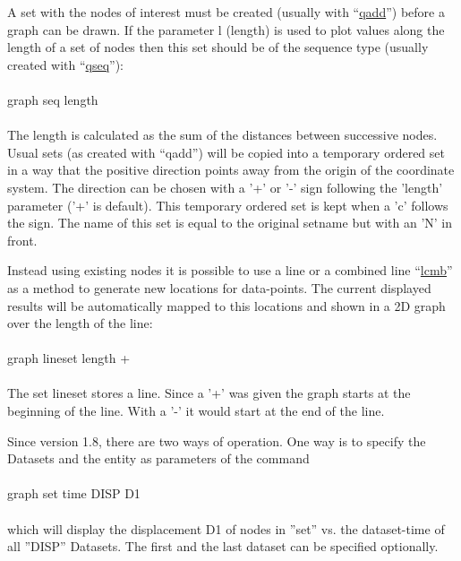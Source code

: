 \documentclass{article}
\providecommand{\htmlref}[2]{\hyperref[#2]{#1}}
\begin{document}
A set with the nodes of interest must be created (usually with ``\htmlref{qadd}{qadd}'') before a graph can be drawn. If the parameter l (length) is used to plot values along the length of a set of nodes then this set should be of the sequence type (usually created with ``\htmlref{qseq}{qseq}''):\\\\graph seq length\\\\The length is calculated as the sum of the distances between successive nodes. Usual sets (as created with ``qadd'') will be copied into a temporary ordered set in a way that the positive direction points away from the origin of the coordinate system. The direction can be chosen with a '+' or '-' sign following the 'length' parameter ('+' is default). This temporary ordered set is kept when a 'c' follows the sign. The name of this set is equal to the original setname but with an 'N' in front.

Instead using existing nodes it is possible to use a line or a combined line ``\htmlref{lcmb}{lcmb}'' as a method to generate new locations for data-points. The current displayed results will be automatically mapped to this locations and shown in a 2D graph over the length of the line:\\\\graph lineset length +\\\\The set lineset stores a line. Since a '+' was given the graph starts at the beginning of the line. With a '-' it would start at the end of the line. 

Since version 1.8, there are two ways of operation. One way is to specify the Datasets and the entity as parameters of the command\\\\graph set time DISP D1\\\\which will display the displacement D1 of nodes in ''set'' vs. the dataset-time of all ''DISP'' Datasets. The first and the last dataset can be specified optionally.
\end{document}
